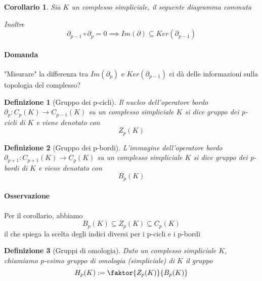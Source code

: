 \documentclass[a4paper]{report}
\newtheorem{definition}{Definizione}
\newtheorem{corollary}{Corollario}
\newcommand{\ra}{\ensuremath{\rightarrow}}
\begin{document}
\begin{corollary}
    Sia $K$ un complesso simpliciale, il seguente diagramma commuta
    \begin{center}
    \end{center}
    Inoltre
    \[
        \partial_{p-1}\circ\partial_p=0\implies Im(\partial)\subseteq Ker(\partial_{p-1})
    \]
\end{corollary}
\paragraph{Domanda} "Misurare" la differenza tra $Im(\partial_p)$ e $Ker(\partial_{p-1})$ ci dà delle informazioni sulla topologia del complesso?
\begin{definition}[Gruppo dei p-cicli]
    Il nucleo dell'operatore bordo $\partial_p:C_p(K)\ra C_{p-1}(K)$ su un complesso simpliciale $K$ si dice gruppo dei p-cicli di $K$ e viene denotato con
    \[
        Z_p(K)
    \]
\end{definition}
\begin{definition}[Gruppo dei p-bordi]
    L'immagine dell'operatore bordo $\partial_{p+1}:C_{p+1}(K)\ra C_{p}(K)$ su un complesso simpliciale $K$ si dice gruppo dei p-bordi di $K$ e viene denotato con
    \[
        B_p(K)
    \]
\end{definition}
\paragraph{Osservazione}
Per il corollario, abbiamo
\[
    B_p(K)\subseteq Z_p(K)\subseteq C_p(K)
\]
il che spiega la scelta degli indici diversi per i p-cicli e i p-bordi
\begin{definition}[Gruppi di omologia]
    Dato un complesso simpliciale $K$, chiamiamo p-esimo gruppo di omologia (simpliciale) di $K$ il gruppo
    \[
        H_p(K):=\faktor{Z_p(K)}{B_p(K)}
    \]
\end{definition}
\pagebreak
\end{document}
